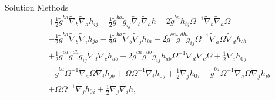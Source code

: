 \documentclass[8pt,aspectratio=1610]{beamer}
\begin{document}
\begin{frame}{Solution Methods}
\begin{eqnarray}
		&&+ \tfrac{1}{2} \tilde{g}^{ba} \tilde{\nabla}_{b}\tilde{\nabla}_{a}h_{ij} -  \tfrac{1}{2} \tilde{g}^{ba} \tilde{g}_{ij} \tilde{\nabla}_{b}\tilde{\nabla}_{a}h - 2 \tilde{g}^{ba} h_{ij} \Omega^{-1} \tilde{\nabla}_{b}\tilde{\nabla}_{a}\Omega  
		\nonumber\\
		&& -  \tfrac{1}{2} \tilde{g}^{ba} \tilde{\nabla}_{b}\tilde{\nabla}_{i}h_{ja} -  \tfrac{1}{2} \tilde{g}^{ba} \tilde{\nabla}_{b}\tilde{\nabla}_{j}h_{ia} + 2 \tilde{g}^{ca} \tilde{g}^{db} \tilde{g}_{ij} \Omega^{-1} \tilde{\nabla}_{a}\Omega \tilde{\nabla}_{d}h_{cb} 
		\nonumber\\
		&& + \tfrac{1}{2} \tilde{g}^{ca} \tilde{g}^{db} \tilde{g}_{ij} \tilde{\nabla}_{d}\tilde{\nabla}_{c}h_{ab}  + 2 \tilde{g}^{ca} \tilde{g}^{db} \tilde{g}_{ij} h_{ab} \Omega^{-1} \tilde{\nabla}_{d}\tilde{\nabla}_{c}\Omega + \tfrac{1}{2} \tilde{\nabla}_{i}\dot{h}_{0}{}_{j} 
		\nonumber\\
		&& -  \tilde{g}^{ba} \Omega^{-1} \tilde{\nabla}_{a}\Omega \tilde{\nabla}_{i}h_{jb} + \dot{\Omega} \Omega^{-1} \tilde{\nabla}_{i}h_{0}{}_{j} + \tfrac{1}{2} \tilde{\nabla}_{j}\dot{h}_{0}{}_{i} -  \tilde{g}^{ba} \Omega^{-1} \tilde{\nabla}_{a}\Omega \tilde{\nabla}_{j}h_{ib}
		\nonumber\\
		&&  + \dot{\Omega} \Omega^{-1} \tilde{\nabla}_{j}h_{0}{}_{i} + \tfrac{1}{2} \tilde{\nabla}_{j}\tilde{\nabla}_{i}h,
	\end{eqnarray}

\end{frame}



\end{document}
